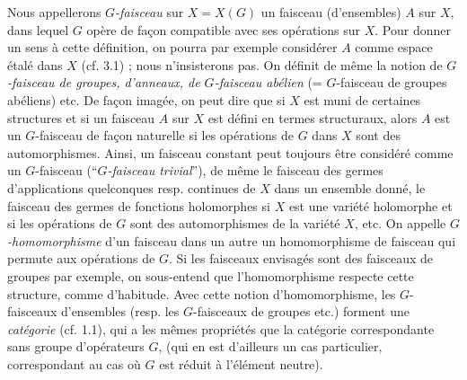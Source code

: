 Nous appellerons \textit{$G$-faisceau} sur $X=X(G)$ un faisceau (d'ensembles)
$A$ sur $X$, dans lequel $G$ opère de façon compatible avec ses opérations
sur $X$. Pour donner un sens à cette définition, on pourra par exemple
considérer $A$ comme espace étalé dans $X$ (cf. 3.1) ; nous n'insisterons pas.
On définit de même la notion de \textit{$G$-faisceau de groupes, d'anneaux,
de $G$-faisceau abélien} (= $G$-faisceau de groupes abéliens) etc.
De façon imagée, on peut dire que si $X$ est muni de certaines structures et
si un faisceau $A$ sur $X$ est défini en termes structuraux, alors $A$ est un
$G$-faisceau de façon naturelle si les opérations de $G$ dans $X$ sont des
automorphismes. Ainsi, un faisceau constant peut toujours être considéré comme
un $G$-faisceau (``\textit{$G$-faisceau trivial}''), de même le faisceau des germes
d'applications quelconques resp. continues de $X$ dans un ensemble donné, le
faisceau des germes de fonctions holomorphes si $X$ est une variété holomorphe
et si les opérations de $G$ sont des automorphismes de la variété $X$, etc.
On appelle \textit{$G$-homomorphisme} d'un faisceau dans un autre un
homomorphisme de faisceau qui permute aux opérations de $G$. Si les faisceaux
envisagés sont des faisceaux de groupes par exemple, on sous-entend que
l'homomorphisme respecte cette structure, comme d'habitude.
Avec cette notion d'homomorphisme, les $G$-faisceaux d'ensembles (resp. les
$G$-faisceaux de groupes etc.) forment une \textit{catégorie} (cf. 1.1), qui a
les mêmes propriétés que la catégorie correspondante sans groupe d'opérateurs
$G$, (qui en est d'ailleurs un cas particulier, correspondant au cas où $G$
est réduit à l'élément neutre).

